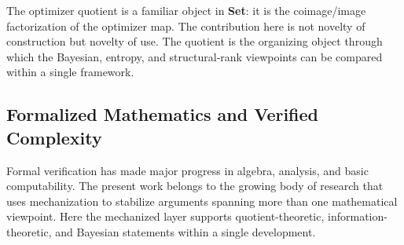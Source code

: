 The optimizer quotient is a familiar object in \textbf{Set}: it is the coimage/image factorization of the optimizer map. The contribution here is not novelty of construction but novelty of use. The quotient is the organizing object through which the Bayesian, entropy, and structural-rank viewpoints can be compared within a single framework.

\subsection{Formalized Mathematics and Verified Complexity}

Formal verification has made major progress in algebra, analysis, and basic computability. The present work belongs to the growing body of research that uses mechanization to stabilize arguments spanning more than one mathematical viewpoint. Here the mechanized layer supports quotient-theoretic, information-theoretic, and Bayesian statements within a single development.
